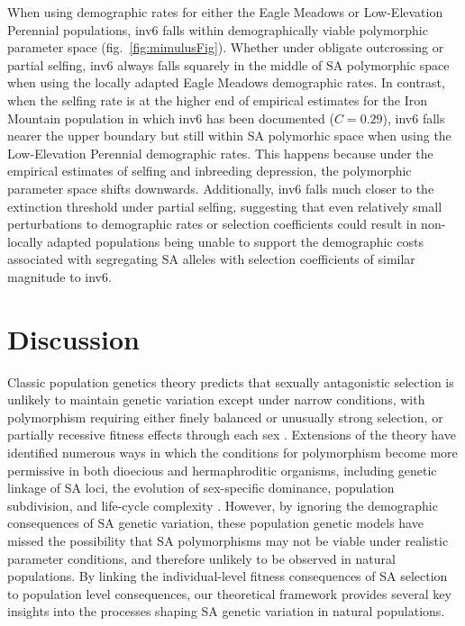 \documentclass[11pt]{article}
\begin{document}
When using demographic rates for either the Eagle Meadows or Low-Elevation Perennial populations, inv6 falls within demographically viable polymorphic parameter space (fig.~\ref{fig:mimulusFig}). Whether under obligate outcrossing or partial selfing, inv6 always falls squarely in the middle of SA polymorphic space when using the locally adapted Eagle Meadows demographic rates. In contrast, when the selfing rate is at the higher end of empirical estimates for the Iron Mountain population in which inv6 has been documented ($C = 0.29$), inv6 falls nearer the upper boundary but still within SA polymorhic space when using the Low-Elevation Perennial demographic rates. This happens because under the empirical estimates of selfing and inbreeding depression, the polymorphic parameter space shifts downwards. Additionally, inv6 falls much closer to the extinction threshold under partial selfing,  suggesting that even relatively small perturbations to demographic rates or selection coefficients could result in non-locally adapted populations being unable to support the demographic costs associated with segregating SA alleles with selection coefficients of similar magnitude to inv6. 


\section*{Discussion}

Classic population genetics theory predicts that sexually antagonistic selection is unlikely to maintain genetic variation except under narrow conditions, with polymorphism requiring either finely balanced or unusually strong selection, or partially recessive fitness effects through each sex \citep{Kidwell1977,Pamilo1979,Prout2000, ConnallonClark2014}. Extensions of the theory have identified numerous ways in which the conditions for polymorphism become more permissive in both dioecious and hermaphroditic organisms, including genetic linkage of SA loci, the evolution of sex-specific dominance, population subdivision, and life-cycle complexity \citep[e.g.,][]{Patten2010,JordanConnallon2014,JordanCharlesworth2012,SpencerPriest2016, ConnallonSharmaOlito2019, Olito-etal-2018}. However, by ignoring the demographic consequences of SA genetic variation, these population genetic models have missed the possibility that SA polymorphisms may not be viable under realistic parameter conditions, and therefore unlikely to be observed in natural populations. By linking the individual-level fitness consequences of SA selection to population level consequences, our theoretical framework provides several key insights into the processes shaping SA genetic variation in natural populations.
\end{document}

